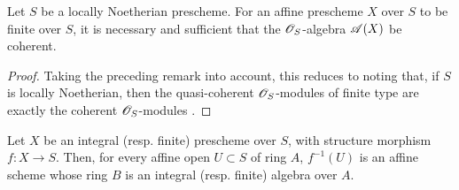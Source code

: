 \begin{proposition}[6.1.3]
\label{II.6.1.3}
Let $S$ be a locally Noetherian prescheme.
For an affine prescheme $X$ over $S$ to be finite over $S$, it is necessary and sufficient that the $\mathscr{O}_S$-algebra $\mathscr{A}(X)$ be coherent.
\end{proposition}

\begin{proof}
Taking the preceding remark into account, this reduces to noting that, if $S$ is locally Noetherian, then the quasi-coherent $\mathscr{O}_S$-modules of finite type are exactly the coherent $\mathscr{O}_S$-modules .
\end{proof}

\begin{proposition}[6.1.4]
\label{II.6.1.4}
Let $X$ be an integral (resp. finite) prescheme over $S$, with structure morphism $f:X\to S$.
Then, for every affine open $U\subset S$ of ring $A$, $f^{-1}(U)$ is an affine scheme whose ring $B$ is an integral (resp. finite) algebra over $A$.
\end{proposition}

